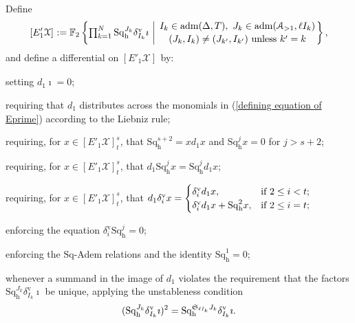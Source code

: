 \documentclass[11pt]{amsart} \renewcommand{\baselinestretch}{1.4}
\theoremstyle{plain}
\theoremstyle{definition}
\newcommand{\calA}{\mathcal{A}}
\newcommand{\calx}{\mathcal{X}}
\newcommand{\Sq}{\mathrm{Sq}}
\newcommand{\LieSteen}{\calA}
\newcommand{\aDTnoplus}{\mathrm{adm}(\Delta,T)}
\newcommand{\aS}[1]{\mathrm{adm}(\LieSteen_{>1},#1)}
\newcommand{\F}{\mathbb{F}}
\newcommand{\Ftwo}{\F_2}
\newcommand{\STOP}{\mathfrak{S}}
\newcommand{\Eprime}[5]{[E'_{#2}#3]^{#4}_{#5}}
\newcommand{\uver}{^\mathrm{v}}
\newcommand{\dhor}{_\mathrm{h}}
\newcommand{\Sqh}{\mathrm{Sq}\dhor}
\newcommand{\deltav}{\delta\uver}
\begin{document}
\begin{Calculations of HWn for n nonzero}
Define
\begin{equation}\label{defining equation of Eprime}
\Eprime{blank}{1}{\calx}{}{}:=
\Ftwo\left\{\textstyle\prod_{k=1}^N\Sq\dhor^{J_k}\deltav_{I_k}\imath\ \middle|\ 
\genfrac{}{}{0pt}{}{I_k\in \aDTnoplus,\ J_k\in \aS{\ell I_k}}{(J_k,I_k)\neq (J_{k'},I_{k'})\textup{ unless }k'=k}
\right\},
\end{equation}
and define a differential on $\Eprime{blank}{1}{\calx}{}{}$ by:
\setcounter{keepeqno}{\value{equation}}%
  \begin{list}{(\theequation)}{}%
  \setcounter{equation}{\value{keepeqno}}
\item \label{ITM1} setting $d_1\imath=0$;
\item \label{ITM2} requiring that $d_1$ distributes across the monomials in (\ref{defining equation of Eprime}) according to the Liebniz rule;
\item \label{ITM2.5} %
requiring, for $x\in \Eprime{blank}{1}{\calx}{s}{t}$, that $\Sqh^{s+2}=xd_1x$ and $\Sqh^jx=0$ for $j>s+2$;
\item \label{ITM3} requiring, for $x\in \Eprime{blank}{1}{\calx}{s}{t}$, that $d_1\Sqh^jx = \Sqh^jd_1x$;
\item \label{ITM4}
requiring, for $x\in \Eprime{blank}{1}{\calx}{s}{t}$, that $d_1\deltav_ix=
\begin{cases}
\deltav_id_1x,&\textup{if $2\leq i < t$};\\
\deltav_id_1x + \Sqh^2 x,&\textup{if $2\leq i = t$};
\end{cases}$
\item \label{ITM5} enforcing the equation $\deltav_i\Sqh^j=0$;
\item \label{ITM6} enforcing the $\Sq$-Adem relations and the identity $\Sqh^1=0$;
\item \label{ITM7} 
whenever a summand in the image of $d_1$ violates the requirement that the factors $\Sqh^{J_k}\deltav_{I_k}\imath$ be unique, applying the unstableness condition
\[(\Sqh^{J_k}\deltav_{I_k}\imath)^{2}=\Sqh^{\smash{\STOP_{\ell I_k}J_k}}\deltav_{I_k}\imath.\]
\end{list}

\end{Calculations of HWn for n nonzero}
\end{document}
